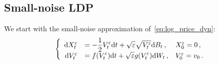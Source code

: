 

\subsection{Small-noise LDP}\label{sec:SmallNoiseLDP}
We start with the small-noise approximation of~\eqref{eq:log_price_dyn}:
\begin{equation}\label{eq:log_price_dynNoise}
\left\{
\begin{array}{rll}
\mathrm{d} X_t^\varepsilon & = \displaystyle  -\frac{1}{2}V_t^\varepsilon \mathrm{d} t + \sqrt{\varepsilon}\sqrt{V_t^\varepsilon} \mathrm{d} B_t\,, & X_0^\varepsilon = 0\,,\\
\mathrm{d} V_t^\varepsilon & = \displaystyle   f(V_t^\varepsilon)\mathrm{d} t + \sqrt{\varepsilon} g(V_t^\varepsilon)\mathrm{d} W_t\,, & V_0^\varepsilon = v_0\,.
\end{array}
\right.
\end{equation}



